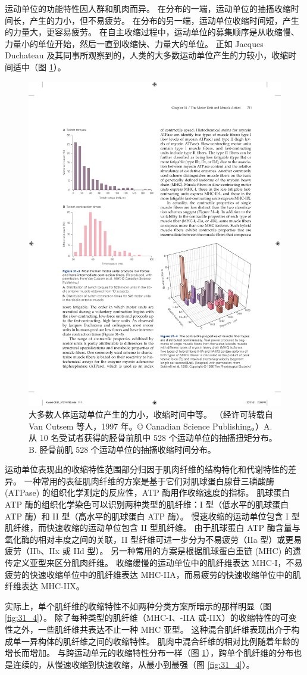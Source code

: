 运动单位的功能特性因人群和肌肉而异。 在分布的一端，运动单位的抽搐收缩时间长，产生的力小，但不易疲劳。 在分布的另一端，运动单位收缩时间短，产生的力量大，更容易疲劳。 在自主收缩过程中，运动单位的募集顺序是从收缩慢、力量小的单位开始，然后一直到收缩快、力量大的单位。 
正如 Jacques Duchateau 及其同事所观察到的，人类的大多数运动单位产生的力较小，收缩时间适中（图 \ref{fig:31_3}）。

\begin{figure}[htbp]
	\centering
	\includegraphics[width=0.5\linewidth]{chap31/fig_31_3}
	\caption{大多数人体运动单位产生的力小，收缩时间中等。 （经许可转载自 Van Cutsem 等人，1997 年。© Canadian Science Publishing。）A. 从 10 名受试者获得的胫骨前肌中 528 个运动单位的抽搐扭矩分布。 B. 胫骨前肌 528 个运动单位的抽搐收缩时间分布。}
	\label{fig:31_3}
\end{figure}

运动单位表现出的收缩特性范围部分归因于肌肉纤维的结构特化和代谢特性的差异。 一种常用的表征肌肉纤维的方案是基于它们对肌球蛋白腺苷三磷酸酶 (ATPase) 的组织化学测定的反应性，ATP 酶用作收缩速度的指标。 肌球蛋白 ATP 酶的组织化学染色可以识别两种类型的肌纤维：I 型（低水平的肌球蛋白 ATP 酶）和 II 型（高水平的肌球蛋白 ATP 酶）。 慢速收缩的运动单位包含 I 型肌纤维，而快速收缩的运动单位包含 II 型肌纤维。 由于肌球蛋白 ATP 酶含量与氧化酶的相对丰度之间的关联，II 型纤维可进一步分为不易疲劳（IIa 型）或更易疲劳（IIb、IIx 或 IId 型）。 另一种常用的方案是根据肌球蛋白重链 (MHC) 的遗传定义亚型来区分肌肉纤维。 收缩缓慢的运动单位中的肌纤维表达 MHC-I，不易疲劳的快速收缩单位中的肌纤维表达 MHC-IIA，而易疲劳的快速收缩单位中的肌纤维表达 MHC-IIX。

实际上，单个肌纤维的收缩特性不如两种分类方案所暗示的那样明显（图 \ref{fig:31_4}）。 
除了每种类型的肌纤维（MHC-I、-IIA 或-IIX）的收缩特性的可变性之外，一些肌纤维共表达不止一种 MHC 亚型。 这种混合肌纤维表现出介于构成单一异构体的肌纤维之间的收缩特性。 肌肉中混合纤维的相对比例随着年龄的增长而增加。 与跨运动单元的收缩特性分布一样（图 \ref{fig:31_3}），跨单个肌纤维的分布也是连续的，从慢速收缩到快速收缩，从最小到最强（图 \ref{fig:31_4}）。

